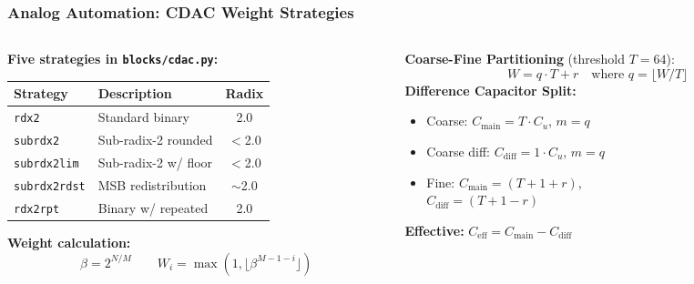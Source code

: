 \documentclass[aspectratio=169]{beamer}
\begin{document}
\begin{frame}
  \frametitle{Analog Automation: CDAC Weight Strategies}
  \begin{columns}
    \begin{column}{0.5\textwidth}
      \small
      \textbf{Five strategies in \texttt{blocks/cdac.py}:}
      \vspace{0.5em}
      \begin{tabular}{l|l|c}
        \hline
        \textbf{Strategy} & \textbf{Description} & \textbf{Radix} \\
        \hline
        \texttt{rdx2} & Standard binary & 2.0 \\
        \texttt{subrdx2} & Sub-radix-2 rounded & $<$2.0 \\
        \texttt{subrdx2lim} & Sub-radix-2 w/ floor & $<$2.0 \\
        \texttt{subrdx2rdst} & MSB redistribution & $\sim$2.0 \\
        \texttt{rdx2rpt} & Binary w/ repeated & 2.0 \\
        \hline
      \end{tabular}
      \vspace{1em}

      \textbf{Weight calculation:}
      \[
        \beta = 2^{N/M} \qquad W_i = \max(1, \lfloor \beta^{M-1-i} \rfloor)
      \]
    \end{column}
    \begin{column}{0.5\textwidth}
      \small
      \textbf{Coarse-Fine Partitioning} (threshold $T=64$):
      \[
        W = q \cdot T + r \quad \text{where } q = \lfloor W/T \rfloor
      \]
      \vspace{0.5em}
      \textbf{Difference Capacitor Split:}
      \begin{itemize}
        \item Coarse: $C_{\mathrm{main}} = T \cdot C_u$, $m = q$
        \item Coarse diff: $C_{\mathrm{diff}} = 1 \cdot C_u$, $m = q$
        \item Fine: $C_{\mathrm{main}} = (T+1+r)$, \\ $C_{\mathrm{diff}} = (T+1-r)$
      \end{itemize}
      \vspace{0.5em}
      \textbf{Effective:} $C_{\mathrm{eff}} = C_{\mathrm{main}} - C_{\mathrm{diff}}$
    \end{column}
  \end{columns}
\end{frame}
\end{document}
